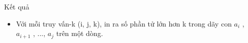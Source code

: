 Kết quả
\begin{itemize}
	\item     Với mỗi truy vấn-k (i, j, k), in ra số phần tử lớn hơn k trong dãy con $a_{i}$    ,   $a_{i+1}$    , ..., $a_{j}$    trên một dòng.    


\end{itemize}